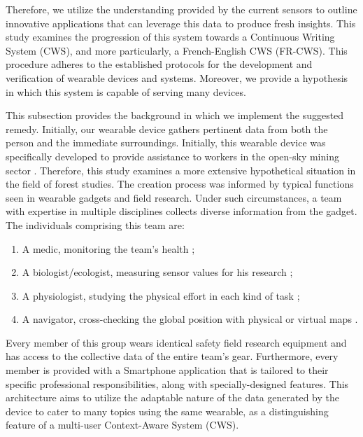 Therefore, we utilize the understanding provided by the current sensors to outline innovative applications that can leverage this data to produce fresh insights. This study examines the progression of this system towards a Continuous Writing System (CWS), and more particularly, a French-English CWS (FR-CWS). This procedure adheres to the established protocols for the development and verification of wearable devices and systems. Moreover, we provide a hypothesis in which this system is capable of serving many devices.

This subsection provides the background in which we implement the suggested remedy. Initially, our wearable device gathers pertinent data from both the person and the immediate surroundings. Initially, this wearable device was specifically developed to provide assistance to workers in the open-sky mining sector \cite{jp2019software}. Therefore, this study examines a more extensive hypothetical situation in the field of forest studies. The creation process was informed by typical functions seen in wearable gadgets and field research. Under such circumstances, a team with expertise in multiple disciplines collects diverse information from the gadget. The individuals comprising this team are:


\begin{enumerate}
    \item A medic, monitoring the team's health \cite{sodhro2018energy, firouzi2018internet};
    \item A biologist/ecologist, measuring sensor values for his research \cite{costa2018abiotic, arena2018multiple, calvao2018land};
    \item A physiologist, studying the physical effort in each kind of task \cite{pereira2018physical, jahanbanifar2018evaluation, weeks2018implementing};
    \item A navigator, cross-checking the global position with physical or virtual maps \cite{velazquez2018outdoor, tjhai2018using, kiss2018navigation}.
\end{enumerate}\vspace{-6pt}

Every member of this group wears identical safety field research equipment and has access to the collective data of the entire team's gear. Furthermore, every member is provided with a Smartphone application that is tailored to their specific professional responsibilities, along with specially-designed features. This architecture aims to utilize the adaptable nature of the data generated by the device to cater to many topics using the same wearable, as a distinguishing feature of a multi-user Context-Aware System (CWS). 


